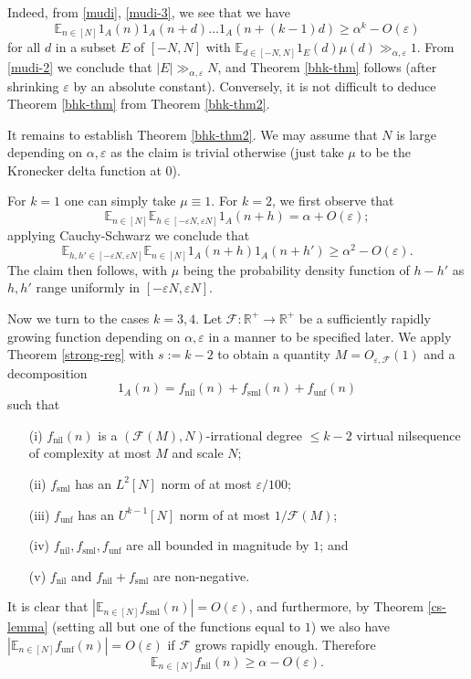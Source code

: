 \documentclass[11pt,reqno]{amsart}
\numberwithin{equation}{section}
\theoremstyle{plain}
\theoremstyle{definition}
\renewcommand{\leq}{\leqslant}
\renewcommand{\geq}{\geqslant}
\newcommand\E{{\mathbb{E}}}
\newcommand\R{\mathbb{R}}
\newcommand\1{{\bf 1}}
\newcommand\2{{\bf 2}}
\newcommand\eps{\varepsilon}
\newcommand\nil{{\operatorname{nil}}}
\newcommand\sml{{\operatorname{sml}}}
\newcommand\unf{{\operatorname{unf}}}
\newcommand\Grow{{\mathcal F}}
\begin{document}
Indeed, from \eqref{mudi}, \eqref{mudi-3}, we see that we have
$$
 \E_{n \in [N]} 1_A(n) 1_A(n+d) \ldots 1_A(n+(k-1)d) \geq \alpha^k - O(\eps)$$
for all $d$ in a subset $E$ of $[-N,N]$ with $\E_{d \in [-N,N]} 1_E(d) \mu(d) \gg_{\alpha,\eps} 1$.  From \eqref{mudi-2} we conclude that $|E| \gg_{\alpha,\eps} N$, and Theorem \ref{bhk-thm} follows (after shrinking $\eps$ by an absolute constant). Conversely, it is not difficult to deduce Theorem \ref{bhk-thm} from Theorem \ref{bhk-thm2}.

It remains to establish Theorem \ref{bhk-thm2}.  We may assume that $N$ is large depending on $\alpha,\eps$ as the claim is trivial otherwise (just take $\mu$ to be the Kronecker delta function at $0$).

For $k=1$ one can simply take $\mu \equiv 1$.  For $k=2$, we first observe that
$$ \E_{n \in [N]} \E_{h \in [-\eps N,\eps N]} 1_A(n+h) = \alpha + O(\eps);$$
applying Cauchy-Schwarz we conclude that
$$ \E_{h,h' \in [-\eps N,\eps N]} \E_{n \in [N]} 1_A(n+h) 1_A(n+h') \geq \alpha^2 - O(\eps).$$
The claim then follows, with $\mu$ being the probability density function of $h-h'$ as $h,h'$ range uniformly in $[-\eps N, \eps N]$.

Now we turn to the cases $k=3,4$.   Let $\Grow: \R^+ \to \R^+$ be a sufficiently rapidly growing function depending on $\alpha,\eps$ in a manner to be specified later.  We apply Theorem \ref{strong-reg} with $s:=k-2$ to obtain a quantity $M = O_{\eps,\Grow}(1)$ and a decomposition
\begin{equation}\label{decomposition} 1_A(n) = f_{\nil}(n) + f_{\sml}(n) + f_{\unf}(n)\end{equation}
such that
\begin{itemize}
\item[(i)] $f_\nil(n)$ is a $(\Grow(M),N)$-irrational degree $\leq k-2$ virtual nilsequence of complexity at most $M$ and scale $N$;
\item[(ii)] $f_\sml$ has an $L^2[N]$ norm of at most $\eps/100$;
\item[(iii)] $f_\unf$ has an $U^{k-1}[N]$ norm of at most $1/\Grow(M)$;
\item[(iv)] $f_\nil, f_\sml, f_\unf$ are all bounded in magnitude by $1$; and
\item[(v)] $f_\nil$ and $f_{\nil} + f_{\sml}$ are non-negative.
\end{itemize}

It is clear that $| \E_{n \in [N]} f_{\sml}(n)| = O(\eps)$, and furthermore, by Theorem \ref{cs-lemma} (setting all but one of the functions equal to $1$) we also have $|\E_{n \in [N]} f_{\unf}(n)| = O(\eps)$ if $\Grow$ grows rapidly enough.
Therefore 
\begin{equation}\label{nnil}
 \E_{n \in [N]} f_\nil(n) \geq \alpha - O(\eps).
\end{equation}
\end{document}

